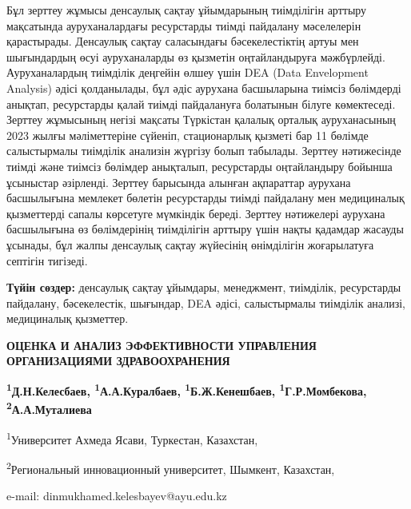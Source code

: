 Бұл зерттеу жұмысы денсаулық сақтау ұйымдарының тиімділігін арттыру
мақсатында ауруханалардағы ресурстарды тиімді пайдалану мәселелерін
қарастырады. Денсаулық сақтау саласындағы бәсекелестіктің артуы мен
шығындардың өсуі ауруханаларды өз қызметін оңтайландыруға мәжбүрлейді.
Ауруханалардың тиімділік деңгейін өлшеу үшін DEA (Data Envelopment
Analysis) әдісі қолданылады, бұл әдіс аурухана басшыларына тиімсіз
бөлімдерді анықтап, ресурстарды қалай тиімді пайдалануға болатынын
білуге көмектеседі. Зерттеу жұмысының негізі мақсаты Түркістан қалалық
орталық ауруханасының 2023 жылғы мәліметтеріне сүйеніп, стационарлық
қызметі бар 11 бөлімде салыстырмалы тиімділік анализін жүргізу болып
табылады. Зерттеу нәтижесінде тиімді және тиімсіз бөлімдер анықталып,
ресурстарды оңтайландыру бойынша ұсыныстар әзірленді. Зерттеу барысында
алынған ақпараттар аурухана басшылығына мемлекет бөлетін ресурстарды
тиімді пайдалану мен медициналық қызметтерді сапалы көрсетуге мүмкіндік
береді. Зерттеу нәтижелері аурухана басшылығына өз бөлімдерінің
тиімділігін арттыру үшін нақты қадамдар жасауды ұсынады, бұл жалпы
денсаулық сақтау жүйесінің өнімділігін жоғарылатуға септігін тигізеді.

{\bfseries Түйін сөздер:} денсаулық сақтау ұйымдары, менеджмент, тиімділік,
ресурстарды пайдалану, бәсекелестік, шығындар, DEA әдісі, салыстырмалы
тиімділік анализі, медициналық қызметтер.

{\bfseries ОЦЕНКА И АНАЛИЗ ЭФФЕКТИВНОСТИ УПРАВЛЕНИЯ ОРГАНИЗАЦИЯМИ
ЗДРАВООХРАНЕНИЯ}

{\bfseries \textsuperscript{1}Д.Н.Келесбаев\textsuperscript{\envelope },
\textsuperscript{1}А.А.Куралбаев, \textsuperscript{1}Б.Ж.Кенешбаев,
\textsuperscript{1}Г.Р.Момбекова, \textsuperscript{2}А.А.Муталиева}

\textsuperscript{1}Университет Ахмеда Ясави, Туркестан, Казахстан,

\textsuperscript{2}Региональный инновационный университет, Шымкент,
Казахстан,

e-mail: dinmukhamed.kelesbayev@ayu.edu.kz

